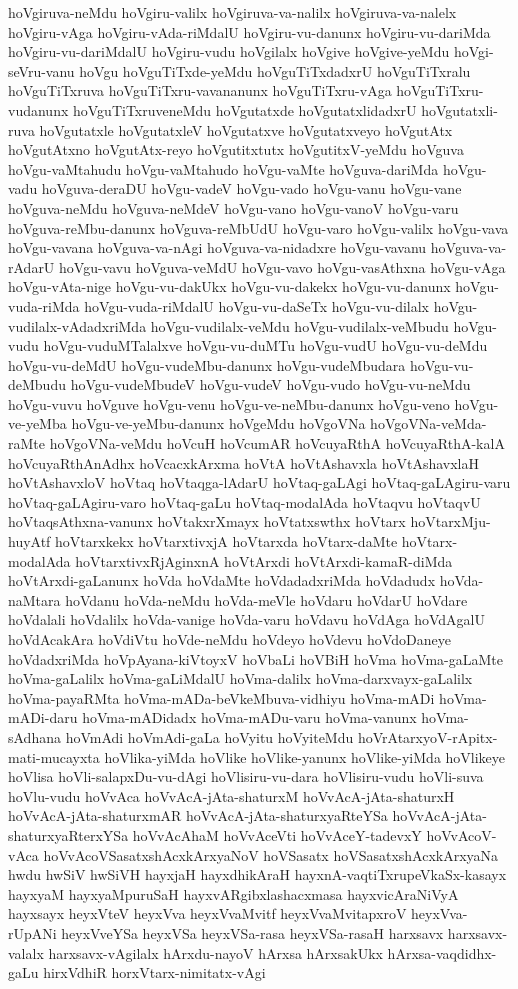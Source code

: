 {hoVgiruva-neMdu
hoVgiru-valilx
hoVgiruva-va-nalilx
hoVgiruva-va-nalelx
hoVgiru-vAga
hoVgiru-vAda-riMdalU
hoVgiru-vu-danunx
hoVgiru-vu-dariMda
hoVgiru-vu-dariMdalU
hoVgiru-vudu
hoVgilalx
hoVgive
hoVgive-yeMdu
hoVgi-seVru-vanu
hoVgu
hoVguTiTxde-yeMdu
hoVguTiTxdadxrU
hoVguTiTxralu
hoVguTiTxruva
hoVguTiTxru-vavananunx
hoVguTiTxru-vAga
hoVguTiTxru-vudanunx
hoVguTiTxruveneMdu
hoVgutatxde
hoVgutatxlidadxrU
hoVgutatxli-ruva
hoVgutatxle
hoVgutatxleV
hoVgutatxve
hoVgutatxveyo
hoVgutAtx
hoVgutAtxno
hoVgutAtx-reyo
hoVgutitxtutx
hoVgutitxV-yeMdu
hoVguva
hoVgu-vaMtahudu
hoVgu-vaMtahudo
hoVgu-vaMte
hoVguva-dariMda
hoVgu-vadu
hoVguva-deraDU
hoVgu-vadeV
hoVgu-vado
hoVgu-vanu
hoVgu-vane
hoVguva-neMdu
hoVguva-neMdeV
hoVgu-vano
hoVgu-vanoV
hoVgu-varu
hoVguva-reMbu-danunx
hoVguva-reMbUdU
hoVgu-varo
hoVgu-valilx
hoVgu-vava
hoVgu-vavana
hoVguva-va-nAgi
hoVguva-va-nidadxre
hoVgu-vavanu
hoVguva-va-rAdarU
hoVgu-vavu
hoVguva-veMdU
hoVgu-vavo
hoVgu-vasAthxna
hoVgu-vAga
hoVgu-vAta-nige
hoVgu-vu-dakUkx
hoVgu-vu-dakekx
hoVgu-vu-danunx
hoVgu-vuda-riMda
hoVgu-vuda-riMdalU
hoVgu-vu-daSeTx
hoVgu-vu-dilalx
hoVgu-vudilalx-vAdadxriMda
hoVgu-vudilalx-veMdu
hoVgu-vudilalx-veMbudu
hoVgu-vudu
hoVgu-vuduMTalalxve
hoVgu-vu-duMTu
hoVgu-vudU
hoVgu-vu-deMdu
hoVgu-vu-deMdU
hoVgu-vudeMbu-danunx
hoVgu-vudeMbudara
hoVgu-vu-deMbudu
hoVgu-vudeMbudeV
hoVgu-vudeV
hoVgu-vudo
hoVgu-vu-neMdu
hoVgu-vuvu
hoVguve
hoVgu-venu
hoVgu-ve-neMbu-danunx
hoVgu-veno
hoVgu-ve-yeMba
hoVgu-ve-yeMbu-danunx
hoVgeMdu
hoVgoVNa
hoVgoVNa-veMda-raMte
hoVgoVNa-veMdu
hoVcuH
hoVcumAR
hoVcuyaRthA
hoVcuyaRthA-kalA
hoVcuyaRthAnAdhx
hoVcacxkArxma
hoVtA
hoVtAshavxla
hoVtAshavxlaH
hoVtAshavxloV
hoVtaq
hoVtaqga-lAdarU
hoVtaq-gaLAgi
hoVtaq-gaLAgiru-varu
hoVtaq-gaLAgiru-varo
hoVtaq-gaLu
hoVtaq-modalAda
hoVtaqvu
hoVtaqvU
hoVtaqsAthxna-vanunx
hoVtakxrXmayx
hoVtatxswthx
hoVtarx
hoVtarxMju-huyAtf
hoVtarxkekx
hoVtarxtivxjA
hoVtarxda
hoVtarx-daMte
hoVtarx-modalAda
hoVtarxtivxRjAginxnA
hoVtArxdi
hoVtArxdi-kamaR-diMda
hoVtArxdi-gaLanunx
hoVda
hoVdaMte
hoVdadadxriMda
hoVdadudx
hoVda-naMtara
hoVdanu
hoVda-neMdu
hoVda-meVle
hoVdaru
hoVdarU
hoVdare
hoVdalali
hoVdalilx
hoVda-vanige
hoVda-varu
hoVdavu
hoVdAga
hoVdAgalU
hoVdAcakAra
hoVdiVtu
hoVde-neMdu
hoVdeyo
hoVdevu
hoVdoDaneye
hoVdadxriMda
hoVpAyana-kiVtoyxV
hoVbaLi
hoVBiH
hoVma
hoVma-gaLaMte
hoVma-gaLalilx
hoVma-gaLiMdalU
hoVma-dalilx
hoVma-darxvayx-gaLalilx
hoVma-payaRMta
hoVma-mADa-beVkeMbuva-vidhiyu
hoVma-mADi
hoVma-mADi-daru
hoVma-mADidadx
hoVma-mADu-varu
hoVma-vanunx
hoVma-sAdhana
hoVmAdi
hoVmAdi-gaLa
hoVyitu
hoVyiteMdu
hoVrAtarxyoV-rApitx-mati-mucayxta
hoVlika-yiMda
hoVlike
hoVlike-yanunx
hoVlike-yiMda
hoVlikeye
hoVlisa
hoVli-salapxDu-vu-dAgi
hoVlisiru-vu-dara
hoVlisiru-vudu
hoVli-suva
hoVlu-vudu
hoVvAca
hoVvAcA-jAta-shaturxM
hoVvAcA-jAta-shaturxH
hoVvAcA-jAta-shaturxmAR
hoVvAcA-jAta-shaturxyaRteYSa
hoVvAcA-jAta-shaturxyaRterxYSa
hoVvAcAhaM
hoVvAceVti
hoVvAceY-tadevxY
hoVvAcoV-vAca
hoVvAcoVSasatxshAcxkArxyaNoV
hoVSasatx
hoVSasatxshAcxkArxyaNa
hwdu
hwSiV
hwSiVH
hayxjaH
hayxdhikAraH
hayxnA-vaqtiTxrupeVkaSx-kasayx
hayxyaM
hayxyaMpuruSaH
hayxvARgibxlashacxmasa
hayxvicAraNiVyA
hayxsayx
heyxVteV
heyxVva
heyxVvaMvitf
heyxVvaMvitapxroV
heyxVva-rUpANi
heyxVveYSa
heyxVSa
heyxVSa-rasa
heyxVSa-rasaH
harxsavx
harxsavx-valalx
harxsavx-vAgilalx
hArxdu-nayoV
hArxsa
hArxsakUkx
hArxsa-vaqdidhx-gaLu
hirxVdhiR
horxVtarx-nimitatx-vAgi
}
